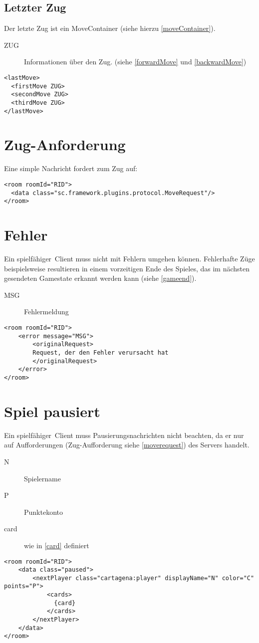 \documentclass[12pt,a4paper, ngerman, oneside]{scrartcl}
\begin{document}
\subsection{\label{lastmove}Letzter Zug}
Der letzte Zug ist ein MoveContainer (siehe hierzu \ref{moveContainer}).
\begin{description}
\item[ZUG] Informationen über den Zug. (siehe \ref{forwardMove} und
\ref{backwardMove})
\end{description}
\begin{verbatim}
<lastMove>
  <firstMove ZUG>
  <secondMove ZUG>
  <thirdMove ZUG>
</lastMove>
\end{verbatim}

\section{\label{moverequest}Zug-Anforderung}
Eine simple Nachricht fordert zum Zug auf:
\begin{verbatim}
<room roomId="RID">
  <data class="sc.framework.plugins.protocol.MoveRequest"/>
</room>
\end{verbatim}

\section{Fehler}
Ein \glqq spielfähiger\grqq\ Client muss nicht mit Fehlern umgehen können.
Fehlerhafte Züge beispielsweise resultieren in einem vorzeitigen Ende des
Spieles, das im nächsten gesendeten Gamestate erkannt werden kann (siehe \ref{gameend}).
\begin{description}
\item[MSG] Fehlermeldung
\end{description}
\begin{verbatim}
<room roomId="RID">
	<error message="MSG">
		<originalRequest>
		Request, der den Fehler verursacht hat
		</originalRequest>
	</error>
</room>
\end{verbatim}

\section{Spiel pausiert}
Ein \glqq spielfähiger\grqq\ Client muss Pausierungsnachrichten nicht beachten,
da er nur auf Aufforderungen (Zug-Aufforderung siehe \ref{moverequest}) des Servers handelt.
\begin{description}
\item[N] Spielername
\item[P] Punktekonto
\item[card] wie in \ref{card} definiert
\end{description}
\begin{verbatim}
<room roomId="RID">
	<data class="paused">
		<nextPlayer class="cartagena:player" displayName="N" color="C" points="P">
			<cards>
			  {card}
			</cards>
		</nextPlayer>
	</data>
</room>
\end{verbatim}
\end{document}
